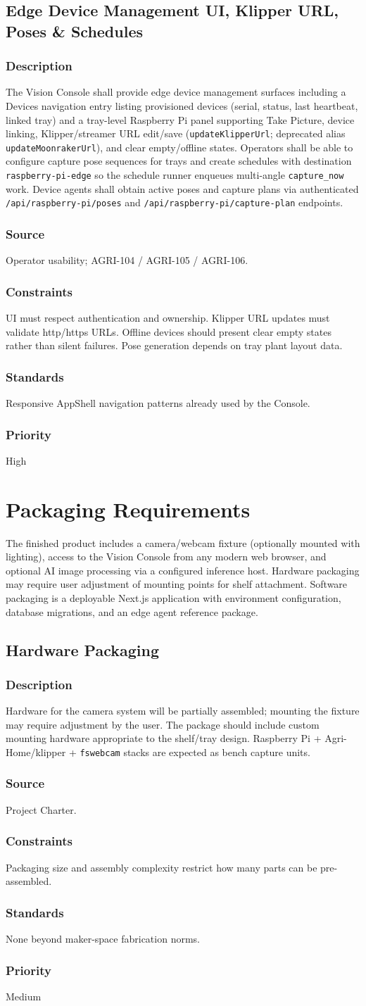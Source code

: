 \documentclass[11pt,letterpaper]{article}
\newcommand{\reqblock}[5]{%
\subsubsection{Description} #1
\subsubsection{Source} #2
\subsubsection{Constraints} #3
\subsubsection{Standards} #4
\subsubsection{Priority} #5
}
\begin{document}
\subsection{Edge Device Management UI, Klipper URL, Poses \& Schedules}
\reqblock
{The Vision Console shall provide edge device management surfaces including a Devices navigation
entry listing provisioned devices (serial, status, last heartbeat, linked tray) and a tray-level
Raspberry Pi panel supporting Take Picture, device linking, Klipper/streamer URL edit/save
(\texttt{updateKlipperUrl}; deprecated alias \texttt{updateMoonrakerUrl}), and clear empty/offline states.
Operators shall be able to configure capture pose sequences for trays and create schedules with
destination \texttt{raspberry-pi-edge} so the schedule runner enqueues multi-angle \texttt{capture\_now} work.
Device agents shall obtain active poses and capture plans via authenticated
\texttt{/api/raspberry-pi/poses} and \texttt{/api/raspberry-pi/capture-plan} endpoints.}
{Operator usability; AGRI-104 / AGRI-105 / AGRI-106.}
{UI must respect authentication and ownership. Klipper URL updates must validate http/https
URLs. Offline devices should present clear empty states rather than silent failures. Pose generation
depends on tray plant layout data.}
{Responsive AppShell navigation patterns already used by the Console.}
{High}

\section{Packaging Requirements}
The finished product includes a camera/webcam fixture (optionally mounted with lighting), access to
the Vision Console from any modern web browser, and optional AI image processing via a configured
inference host. Hardware packaging may require user adjustment of mounting points for shelf
attachment. Software packaging is a deployable Next.js application with environment configuration,
database migrations, and an edge agent reference package.

\subsection{Hardware Packaging}
\reqblock
{Hardware for the camera system will be partially assembled; mounting the fixture may require
adjustment by the user. The package should include custom mounting hardware appropriate to the
shelf/tray design. Raspberry Pi + Agri-Home/klipper + \texttt{fswebcam} stacks are expected as bench capture units.}
{Project Charter.}
{Packaging size and assembly complexity restrict how many parts can be pre-assembled.}
{None beyond maker-space fabrication norms.}
{Medium}
\end{document}
